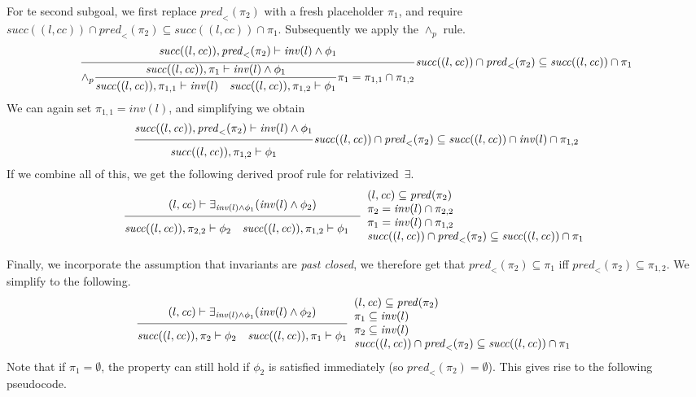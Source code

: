 \documentclass{article}
\newcommand{\proofrule}[3][]{#1 \frac{\raisebox{.7ex}{\normalsize{$#2$}}}
  {\raisebox{-1.0ex}{\normalsize{$#3$}}}}
\newcommand{\placeholder}[1][]{\pi_{#1}}
\newcommand{\loc}{l}
\newcommand{\region}{\mathit{cc}}
\newcommand{\suc}{\mathit{succ}}
\newcommand{\pre}{\mathit{pred}}
\newcommand{\inv}{\mathit{inv}}
\begin{document}
For te second subgoal, we first replace $\pre_{<}(\placeholder[2])$ with a fresh
placeholder $\placeholder[1]$, and require $\suc((\loc, \region)) \cap \pre_{<}(\placeholder[2]) \subseteq \suc((\loc, \region)) \cap \placeholder[1]$.
Subsequently we apply the $\land_p$ rule.
\[
\proofrule
{\suc((\loc, \region)), \pre_{<}(\placeholder[2]) \vdash \inv(\loc) \land \phi_1}
{\proofrule[\land_p]
  {\suc((\loc, \region)), \placeholder[1] \vdash \inv(\loc) \land \phi_1}
  {\suc((\loc, \region)), \placeholder[1,1] \vdash \inv(\loc)
  \quad \suc((\loc, \region)), \placeholder[1,2] \vdash \phi_1}
  \placeholder[1] = \placeholder[1,1] \cap \placeholder[1,2]
}
\suc((\loc, \region)) \cap \pre_{<}(\placeholder[2]) \subseteq \suc((\loc, \region)) \cap \placeholder[1]
\]
We can again set $\placeholder[1,1] = \inv(\loc)$, and simplifying we obtain
\[
\proofrule
{\suc((\loc, \region)), \pre_{<}(\placeholder[2]) \vdash \inv(\loc) \land \phi_1}
{\suc((\loc, \region)), \placeholder[1,2] \vdash \phi_1}
\suc((\loc, \region)) \cap \pre_{<}(\placeholder[2]) \subseteq \suc((\loc, \region)) \cap \inv(\loc) \cap \placeholder[1,2]
\]
%
If we combine all of this, we get the following derived proof rule for relativized~$\exists$.
\[
\proofrule
{(\loc, \region) \vdash \exists_{\inv(\loc) \land \phi_1}(\inv(\loc) \land \phi_2)}
{\suc((\loc,\region)), \placeholder[2,2] \vdash \phi_2
\quad \suc((\loc, \region)), \placeholder[1,2] \vdash \phi_1
\quad }
\begin{array}{l}
(\loc, \region) \subseteq \pre(\placeholder[2]) \\
\placeholder[2] = \inv(\loc) \cap \placeholder[2,2] \\
\placeholder[1] = \inv(\loc) \cap \placeholder[1,2] \\
\suc((\loc, \region)) \cap \pre_{<}(\placeholder[2]) \subseteq \suc((\loc, \region)) \cap \placeholder[1]
\end{array}
\]

Finally, we incorporate the assumption that invariants are \emph{past closed}, we therefore get that $\pre_{<}(\placeholder[2]) \subseteq \placeholder[1]$ iff $\pre_{<}(\placeholder[2]) \subseteq \placeholder[1,2]$. We simplify to the following.
\[
\proofrule
{(\loc, \region) \vdash \exists_{\inv(\loc) \land \phi_1}(\inv(\loc) \land \phi_2)}
{\suc((\loc,\region)), \placeholder[2] \vdash \phi_2
\quad \suc((\loc, \region)), \placeholder[1] \vdash \phi_1
}
\begin{array}{l}
(\loc, \region) \subseteq \pre(\placeholder[2]) \\
\placeholder[1] \subseteq \inv(\loc) \\
\placeholder[2] \subseteq \inv(\loc) \\
\suc((\loc, \region)) \cap \pre_{<}(\placeholder[2]) \subseteq \suc((\loc, \region)) \cap \placeholder[1]
\end{array}
\]
Note that if $\placeholder[1] = \emptyset$, the property can still hold if $\phi_2$ is satisfied immediately (so $\pre_{<}(\placeholder[2]) = \emptyset$). This gives rise to the following pseudocode.
\end{document}
